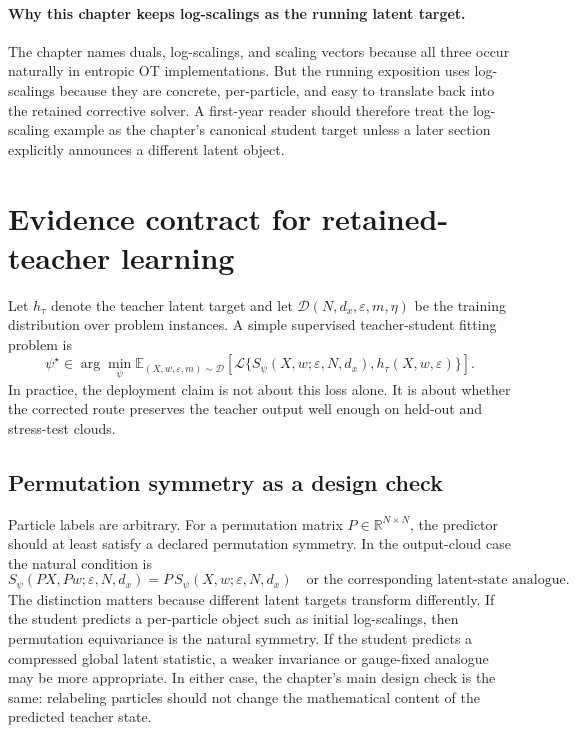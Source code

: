 \paragraph{Why this chapter keeps log-scalings as the running latent target.}
The chapter names duals, log-scalings, and scaling vectors because all three occur
naturally in entropic OT implementations.  But the running exposition uses
log-scalings because they are concrete, per-particle, and easy to translate back
into the retained corrective solver.  A first-year reader should therefore treat the
log-scaling example as the chapter's canonical student target unless a later section
explicitly announces a different latent object.

\section{Evidence contract for retained-teacher learning}
\label{sec:bf-learned-ot-training-objective}

Let \(h_\tau\) denote the teacher latent target and let
\(\mathcal D(N,d_x,\varepsilon,m,\eta)\) be the training distribution over
problem instances.  A simple supervised teacher-student fitting problem is
\begin{equation}
\label{eq:bf-learned-ot-training-objective}
  \psi^\star
  \in
  \arg\min_\psi
  \mathbb E_{(X,w,\varepsilon,m)\sim\mathcal D}
  \left[
    \mathcal L\{S_\psi(X,w;\varepsilon,N,d_x),h_\tau(X,w,\varepsilon)
    \}
  \right].
\end{equation}
In practice, the deployment claim is not about this loss alone.  It is about
whether the corrected route preserves the teacher output well enough on held-out
and stress-test clouds.

\subsection{Permutation symmetry as a design check}
\label{sec:bf-learned-ot-symmetry}

Particle labels are arbitrary.  For a permutation matrix
\(P\in\mathbb R^{N\times N}\), the predictor should at least satisfy a declared
permutation symmetry.  In the output-cloud case the natural condition is
\begin{equation}
\label{eq:bf-learned-ot-equivariance}
  S_\psi(PX,Pw;\varepsilon,N,d_x)
  =
  P\,S_\psi(X,w;\varepsilon,N,d_x)
  \quad
  \text{or the corresponding latent-state analogue.}
\end{equation}
The distinction matters because different latent targets transform differently.  If
the student predicts a per-particle object such as initial log-scalings, then
permutation equivariance is the natural symmetry.  If the student predicts a
compressed global latent statistic, a weaker invariance or gauge-fixed analogue may
be more appropriate.  In either case, the chapter's main design check is the same:
relabeling particles should not change the mathematical content of the predicted
teacher state.

